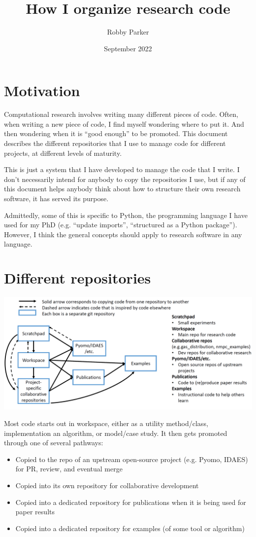 \documentclass{article}
\title{How I organize research code}
\author{Robby Parker}
\date{September 2022}
\begin{document}
\maketitle

\section{Motivation}
Computational research involves writing many different pieces of code.
Often, when writing a new piece of code, I find myself wondering where
to put it. And then wondering when it is ``good enough'' to be promoted.
This document describes the different repositories that I
use to manage code for different projects, at different levels of
maturity.

This is just a system that I have developed to manage the code that
I write. I don't necessarily intend for anybody to copy the repositories
I use, but if any of this document helps anybody think about how to
structure their own research software, it has served its purpose.

Admittedly, some of this is specific to Python, the programming language
I have used for my PhD (e.g. ``update imports'', ``structured as a
Python package''). However, I think the general concepts should apply to
research software in any language.

\section{Different repositories}

\hspace{-1.5cm}\includegraphics[width=15cm]{repo_diagram}

Most code starts out in workspace, either as a utility method/class,
implementation an algorithm, or model/case study.
It then gets promoted through one of several pathways:
\begin{itemize}
  \item Copied to the repo of an upstream open-source project (e.g. Pyomo,
    IDAES) for PR, review, and eventual merge
  \item Copied into its own repository for collaborative development
  \item Copied into a dedicated repository for publications when it is
    being used for paper results
  \item Copied into a dedicated repository for examples (of some tool
    or algorithm)
\end{itemize}
\end{document}
